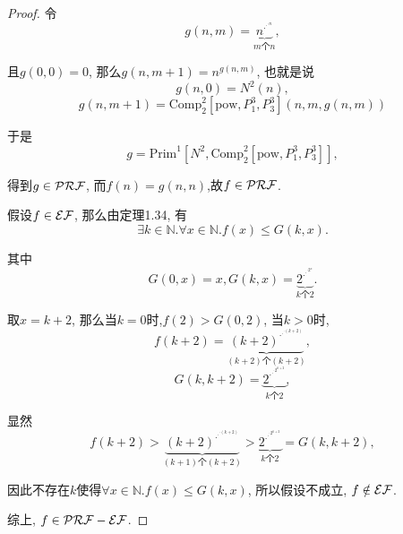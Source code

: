 \begin{proof}
    令$$g(n,m)=\underbrace{n^{\cdot^{\cdot^{\cdot n}}}}_{m\textrm{个}n},$$
	
    且$g(0,0)=0$, 那么$g(n,m+1)=n^{g(n,m)}$, 也就是说
    $$g(n,0)=N^2(n),$$
    $$g(n,m+1)=\mathrm{Comp}^2_2[\mathrm{pow},P^3_1,P^3_3](n,m,g(n,m))$$
	
    于是$$g=\mathrm{Prim}^1[N^2,\mathrm{Comp}^2_2[\mathrm{pow},P^3_1,P^3_3]],$$
	
    得到$g\in\mathcal{PRF}$, 而$f(n)=g(n,n)$,故$f\in\mathcal{PRF}$.

    假设$f\in\mathcal{EF}$, 那么由定理1.34, 有
    $$\exists k\in\mathbb{N}. \forall x\in\mathbb{N}. f(x)\leqslant G(k,x).$$
	
    其中$$G(0,x)=x,G(k,x)=\underbrace{2^{\cdot^{\cdot^{\cdot 2^x}}}}_{k\textrm{个}2}.$$
	
    取$x=k+2$, 那么当$k=0$时,$f(2)>G(0,2)$, 当$k>0$时, $$f(k+2)=\underbrace{(k+2)^{\cdot^{\cdot^{\cdot (k+2)}}}}_{(k+2)\textrm{个}(k+2)},$$
    $$G(k,k+2)=\underbrace{2^{\cdot^{\cdot^{\cdot 2^{k+2}}}}}_{k\textrm{个}2},$$
	
    显然$$f(k+2)>\underbrace{(k+2)^{\cdot^{\cdot^{\cdot (k+2)}}}}_{(k+1)\textrm{个}(k+2)}>\underbrace{2^{\cdot^{\cdot^{\cdot 2^{k+2}}}}}_{k\textrm{个}2}=G(k,k+2),$$
	
    因此不存在$k$使得$\forall x\in\mathbb{N}. f(x)\leqslant G(k,x)$, 所以假设不成立, $f\notin\mathcal{EF}$.

    综上, $f\in\mathcal{PRF}-\mathcal{EF}$.
\end{proof}